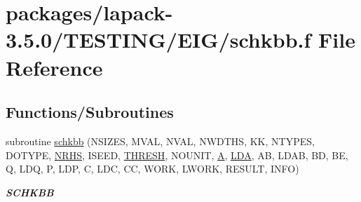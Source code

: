 \hypertarget{schkbb_8f}{}\section{packages/lapack-\/3.5.0/\+T\+E\+S\+T\+I\+N\+G/\+E\+I\+G/schkbb.f File Reference}
\label{schkbb_8f}
\subsection*{Functions/\+Subroutines}
\begin{DoxyCompactItemize}
\item 
subroutine \hyperlink{group__single__eig_ga561a20d64458f92f3e4cf00aab784a20}{schkbb} (N\+S\+I\+Z\+E\+S, M\+V\+A\+L, N\+V\+A\+L, N\+W\+D\+T\+H\+S, K\+K, N\+T\+Y\+P\+E\+S, D\+O\+T\+Y\+P\+E, \hyperlink{example__user_8c_aa0138da002ce2a90360df2f521eb3198}{N\+R\+H\+S}, I\+S\+E\+E\+D, \hyperlink{zlaqgs_8c_a0656018abfc9fa2821827415f5d5ea57}{T\+H\+R\+E\+S\+H}, N\+O\+U\+N\+I\+T, \hyperlink{classA}{A}, \hyperlink{example__user_8c_ae946da542ce0db94dced19b2ecefd1aa}{L\+D\+A}, A\+B, L\+D\+A\+B, B\+D, B\+E, Q, L\+D\+Q, P, L\+D\+P, C, L\+D\+C, C\+C, W\+O\+R\+K, L\+W\+O\+R\+K, R\+E\+S\+U\+L\+T, I\+N\+F\+O)
\begin{DoxyCompactList}\small\item\em {\bfseries S\+C\+H\+K\+B\+B} \end{DoxyCompactList}\end{DoxyCompactItemize}
